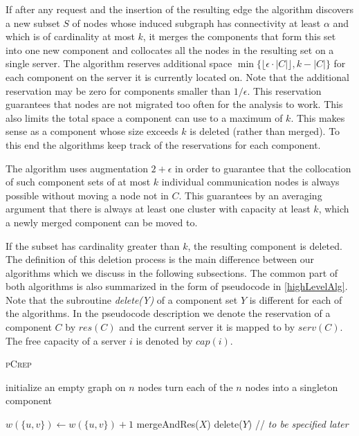 \documentclass[a4paper,UKenglish,cleveref, autoref, thm-restate,authorcolumns]{lipics-v2019}
\newcommand{\adjDel}{\textsc{pCrep}}
\begin{document}
If after any request and the insertion of the resulting edge the algorithm discovers a new subset $S$ of nodes whose induced subgraph has connectivity at least $\alpha$ and which is of cardinality at most $k$, it merges the components that form this set into one new component and collocates all the nodes in the resulting set on a single server. The algorithm reserves additional space $\min\{\lfloor\epsilon\cdot|C|\rfloor,k-|C|\}$ for each component on the server it is currently located on. Note that the additional reservation may be zero for components smaller than $1/\epsilon$. This reservation guarantees that nodes are not migrated too often for the analysis to work. This also limits the total space a component can use to a maximum of $k$. This makes sense as a component whose size exceeds $k$ is deleted (rather than merged).
To this end the algorithms keep track of the reservations for each component.

The algorithm uses augmentation $2+\epsilon$ in order to guarantee that the collocation of such component sets of at most $k$ individual communication nodes is always possible without moving a node not in $C$. This guarantees by an averaging argument that there is always at least one cluster with capacity at least $k$, which a newly merged component can be moved to.

If the subset has cardinality greater than $k$, the resulting component is deleted. The definition of this deletion process is the main difference between our algorithms which we discuss in the following subsections. The common part of both algorithms is also summarized in the form of pseudocode in \cref{highLevelAlg}. Note that the subroutine \textit{delete(Y)} of a component set $Y$ is different for each of the algorithms. 
In the pseudocode description we denote the reservation of a component $C$ by $res(C)$ and the current server it is mapped to by $serv(C)$. The free capacity of a server $i$ is denoted by $cap(i)$.

\begin{algorithm}[t]
	\caption{\adjDel{}}
	\label{highLevelAlg}
	\begin{algorithmic}
		\STATE initialize an empty graph on $n$ nodes
		\STATE turn each of the $n$ nodes into a singleton component
		
		\STATE $w(\{u,v\})\gets w(\{u,v\})+1$
		\ENDIF
		\STATE mergeAndRes($X$)
		\ENDIF
		\STATE delete($Y$) // \emph{to be specified later} 
		\ENDIF	
		
		\ENDFOR
		
	\end{algorithmic}
\end{algorithm}
\end{document}
